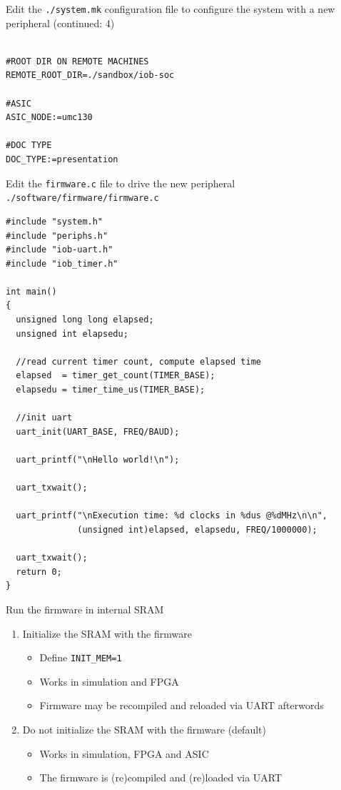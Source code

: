 \documentclass [xcolor=svgnames, t] {beamer}
\begin{document}
\begin{frame}[fragile]{Edit the {\tt ./system.mk} configuration file to configure the system with a new peripheral (continued: 4)}
\begin{tiny}
\begin{lstlisting}

#ROOT DIR ON REMOTE MACHINES
REMOTE_ROOT_DIR=./sandbox/iob-soc

#ASIC
ASIC_NODE:=umc130

#DOC TYPE
DOC_TYPE:=presentation
\end{lstlisting}
\end{tiny}
\end{frame}


\begin{frame}[fragile]{Edit the {\tt firmware.c} file to drive the new peripheral}
  {\tt ./software/firmware/firmware.c}
  \begin{tiny}
    \begin{lstlisting}
#include "system.h"
#include "periphs.h"
#include "iob-uart.h"
#include "iob_timer.h"

int main()
{
  unsigned long long elapsed;
  unsigned int elapsedu;

  //read current timer count, compute elapsed time
  elapsed  = timer_get_count(TIMER_BASE);
  elapsedu = timer_time_us(TIMER_BASE);

  //init uart 
  uart_init(UART_BASE, FREQ/BAUD);

  uart_printf("\nHello world!\n");
  
  uart_txwait();

  uart_printf("\nExecution time: %d clocks in %dus @%dMHz\n\n", 
              (unsigned int)elapsed, elapsedu, FREQ/1000000);

  uart_txwait();
  return 0;
}
\end{lstlisting}
\end{tiny}
\end{frame}


\begin{frame}{Run the firmware in internal SRAM}
\begin{enumerate}
\item Initialize the SRAM with the firmware
  \begin{itemize}
  \item Define {\tt INIT\_MEM=1}
  \item Works in simulation and FPGA
  \item Firmware may be recompiled and reloaded via UART afterwords
  \end{itemize}
\item Do not initialize the SRAM with the firmware (default)
  \begin{itemize}
  \item Works in simulation, FPGA and ASIC
  \item The firmware is (re)compiled and (re)loaded via UART
  \end{itemize}
\end{enumerate}
\end{frame}
\end{document}
